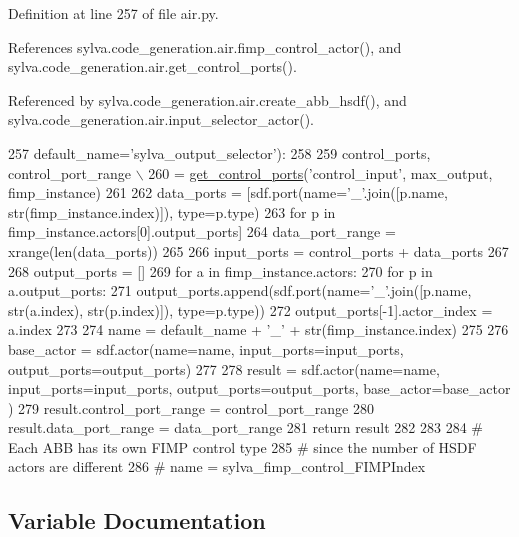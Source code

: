 Definition at line 257 of file air.\+py.



References sylva.\+code\+\_\+generation.\+air.\+fimp\+\_\+control\+\_\+actor(), and sylva.\+code\+\_\+generation.\+air.\+get\+\_\+control\+\_\+ports().



Referenced by sylva.\+code\+\_\+generation.\+air.\+create\+\_\+abb\+\_\+hsdf(), and sylva.\+code\+\_\+generation.\+air.\+input\+\_\+selector\+\_\+actor().


\begin{DoxyCode}
257                           default\_name=\textcolor{stringliteral}{'sylva\_output\_selector'}):
258 
259     control\_ports, control\_port\_range \(\backslash\)
260         = \hyperlink{namespacesylva_1_1code__generation_1_1air_a71d379169f113b29c326aa9f70c6d47e}{get\_control\_ports}(\textcolor{stringliteral}{'control\_input'}, max\_output, fimp\_instance)
261 
262     data\_ports = [sdf.port(name=\textcolor{stringliteral}{'\_'}.join([p.name, str(fimp\_instance.index)]), type=p.type)
263                   \textcolor{keywordflow}{for} p \textcolor{keywordflow}{in} fimp\_instance.actors[0].output\_ports]
264     data\_port\_range = xrange(len(data\_ports))
265 
266     input\_ports = control\_ports + data\_ports
267 
268     output\_ports = []
269     \textcolor{keywordflow}{for} a \textcolor{keywordflow}{in} fimp\_instance.actors:
270         \textcolor{keywordflow}{for} p \textcolor{keywordflow}{in} a.output\_ports:
271             output\_ports.append(sdf.port(name=\textcolor{stringliteral}{'\_'}.join([p.name, str(a.index), str(p.index)]), type=p.type))
272             output\_ports[-1].actor\_index = a.index
273 
274     name = default\_name + \textcolor{stringliteral}{'\_'} + str(fimp\_instance.index)
275 
276     base\_actor = sdf.actor(name=name, input\_ports=input\_ports, output\_ports=output\_ports)
277 
278     result = sdf.actor(name=name, input\_ports=input\_ports, output\_ports=output\_ports, base\_actor=base\_actor
      )
279     result.control\_port\_range = control\_port\_range
280     result.data\_port\_range = data\_port\_range
281     \textcolor{keywordflow}{return} result
282 
283 
284 \textcolor{comment}{# Each ABB has its own FIMP control type}
285 \textcolor{comment}{# since the number of HSDF actors are different}
286 \textcolor{comment}{# name = sylva\_fimp\_control\_FIMPIndex}
\end{DoxyCode}


\subsection{Variable Documentation}
\mbox{\label{namespacesylva_1_1code__generation_1_1air_adfbe6169cf7f46d110aa5f8a54023255}} 
